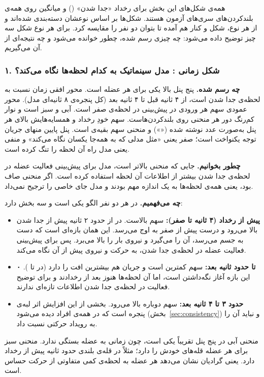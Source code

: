همه‌ی شکل‌های این بخش برای رخداد «جدا شدن» () و میانگین روی همه‌ی بلندکردن‌های سری‌های آزمون هستند. شکل‌ها بر اساس نوعشان دسته‌بندی شده‌اند و از هر نوع، شکل  و  کنار هم آمده تا بتوان دو نفر را مقایسه کرد. برای هر نوع شکل سه چیز توضیح داده می‌شود: چه چیزی رسم شده، چطور خوانده می‌شود و چه نتیجه‌ای از آن می‌گیریم.

\subsubsection*{۱. شکل زمانی : مدل سینماتیک به کدام لحظه‌ها نگاه می‌کند؟}

\textbf{چه رسم شده.} پنج پنل بالا یکی برای هر عضله است. محور افقی زمان نسبت به لحظه‌ی جدا شدن است، از ۴ ثانیه قبل تا ۴ ثانیه بعد (کل پنجره‌ی ۸ ثانیه‌ای مدل). محور عمودی سهم هر  ورودی در پیش‌بینی  در لحظه‌ی صفر است. آبی  و سبز  است و نوار کم‌رنگ دور هر منحنی  روی بلندکردن‌هاست. سهم خودِ  رخداد و همسایه‌هایش بالای هر پنل به‌صورت عدد نوشته شده (\mbox{«»}) و منحنی سهم بقیه‌ی  است. پنل پایین  منهای جریان توجه یکنواخت است؛ صفر یعنی «مثل مدلی که به همه‌جا یکسان نگاه می‌کند» و منفی یعنی مدل راه آن لحظه را تنگ کرده است.

\textbf{چطور بخوانیم.} جایی که منحنی بالاتر است، مدل برای پیش‌بینی فعالیت عضله در لحظه‌ی جدا شدن بیشتر از اطلاعات آن لحظه استفاده کرده است. اگر منحنی صاف بود، یعنی همه‌ی لحظه‌ها به یک اندازه مهم بودند و مدل جای خاصی را ترجیح نمی‌داد.

\textbf{چه می‌فهمیم.} در هر دو نفر الگو یکی است و سه بخش دارد:
\begin{itemize}
\item \textbf{پیش از رخداد (۴ ثانیه تا صفر):} سهم بالاست. در  از حدود ۲ ثانیه پیش از جدا شدن بالا می‌رود و درست پیش از صفر به اوج می‌رسد. این همان بازه‌ای است که دست به جسم می‌رسد، آن را می‌گیرد و نیروی بار را بالا می‌برد. پس  برای پیش‌بینی فعالیت عضله در لحظه‌ی جدا شدن، به حرکت و نیروی پیش از آن نگاه می‌کند.
\item \textbf{۰ تا حدود  ثانیه بعد:} سهم کمترین است و جریان هم بیشترین افت را دارد (در  تا ). این بازه آغاز نگه‌داشتن است، اما آن لحظه‌ها هنوز بعد از رخدادند و برای توضیح فعالیت در لحظه‌ی جدا شدن اطلاعات تازه‌ای ندارند.
\item \textbf{حدود ۳ تا ۴ ثانیه بعد:} سهم دوباره بالا می‌رود. بخشی از این افزایش اثر لبه‌ی پنجره است که در همه‌ی افراد دیده می‌شود (بخش~\ref{sec:consistency}) و نباید آن را به رویداد حرکتی نسبت داد.
\end{itemize}
منحنی آبی در پنج پنل تقریباً یکی است، چون  زمانی به عضله بستگی ندارد. منحنی سبز برای هر عضله قله‌های خودش را دارد؛ مثلاً در   قله‌ی بلندی حدود  ثانیه پیش از رخداد دارد. یعنی گرادیان نشان می‌دهد هر عضله به لحظه‌ی کمی متفاوتی از حرکت حساس است.

